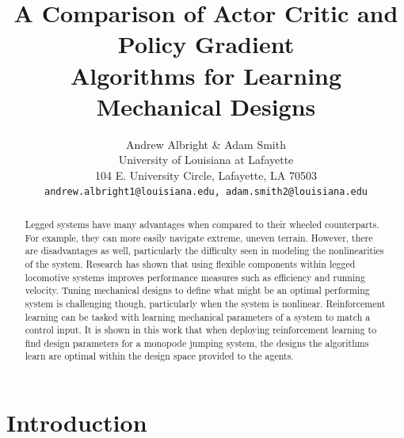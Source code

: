 \documentclass[10pt,twocolumn,letterpaper]{article}
\begin{document}
\title{A Comparison of Actor Critic and Policy Gradient \\ Algorithms for Learning Mechanical Designs}

\author{Andrew Albright \& Adam Smith\\
University of Louisiana at Lafayette\\
104 E. University Circle, Lafayette, LA 70503\\
{\tt\small andrew.albright1@louisiana.edu, adam.smith2@louisiana.edu}
}
\maketitle

\begin{abstract}
  Legged systems have many advantages when compared to their wheeled counterparts. For example, they can more easily navigate extreme, uneven terrain. However, there are disadvantages as well, particularly the difficulty seen in modeling the nonlinearities of the system. Research has shown that using flexible components within legged locomotive systems improves performance measures such as efficiency and running velocity. Tuning mechanical designs to define what might be an optimal performing system is challenging though, particularly when the system is nonlinear. Reinforcement learning can be tasked with learning mechanical parameters of a system to match a control input. It is shown in this work that when deploying reinforcement learning to find design parameters for a monopode jumping system, the designs the algorithms learn are optimal within the design space provided to the agents.
\end{abstract}

\section{Introduction}
\label{sec:intro}
\end{document}
